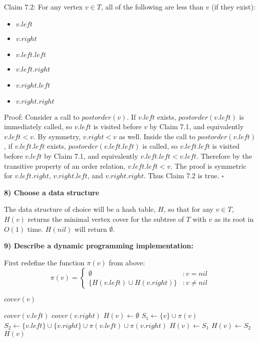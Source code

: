 \documentclass{article}
\begin{document}
Claim 7.2: For any vertex $v \in T$, all of the following are less than $v$ (if
they exist):
\begin{itemize}
\item $v.left$
\item $v.right$
\item $v.left.left$
\item $v.left.right$
\item $v.right.left$
\item $v.right.right$
\end{itemize}
Proof: Consider a call to $postorder(v)$. If $v.left$ exists,
$postorder(v.left)$ is immediately called, so $v.left$ is visited before $v$ by
Claim 7.1, and equivalently $v.left < v$. By symmetry, $v.right < v$ as
well. Inside the call to $postorder(v.left)$, if $v.left.left$ exists,
$postorder(v.left.left)$ is called, so $v.left.left$ is visited before $v.left$
by Claim 7.1, and equivalently $v.left.left < v.left$. Therefore by the
transitive property of an order relation, $v.left.left < v$. The proof is
symmetric for $v.left.right$, $v.right.left$, and $v.right.right$. Thus Claim
7.2 is true. $\square$

\textbf{8) Choose a data structure}

The data structure of choice will be a hash table, $H$, so that for any $v \in
T$, $H(v)$ returns the minimal vertex cover for the subtree of $T$ with $v$ as
its root in $O(1)$ time. $H(nil)$ will return $\emptyset$.

\textbf{9) Describe a dynamic programming implementation:}

First redefine the function $\pi(v)$ from above:
\begin{displaymath}
\pi(v) = \left\{
	\begin{array}{lr}
	\emptyset & : v = nil \\
	\{H(v.left) \cup H(v.right)\} & : v \neq nil
	\end{array}
	\right.
\end{displaymath}

$cover(v)$
\begin{algorithmic}[1]
	\STATE $cover(v.left)$
\ENDIF
{}
	\STATE $cover(v.right)$
\ENDIF
{}
	\STATE $H(v) \gets \emptyset$
\ELSE
	\STATE $S_1\gets\{v\}\cup\pi(v)$
	\STATE $S_2\gets\{v.left\}\cup\{v.right\}\cup\pi(v.left)\cup\pi(v.right)$
		\STATE $H(v) \gets S_1$
	\ELSE
		\STATE $H(v) \gets S_2$
	\ENDIF
\ENDIF
\RETURN $H(v)$
\end{algorithmic}
\end{document}
